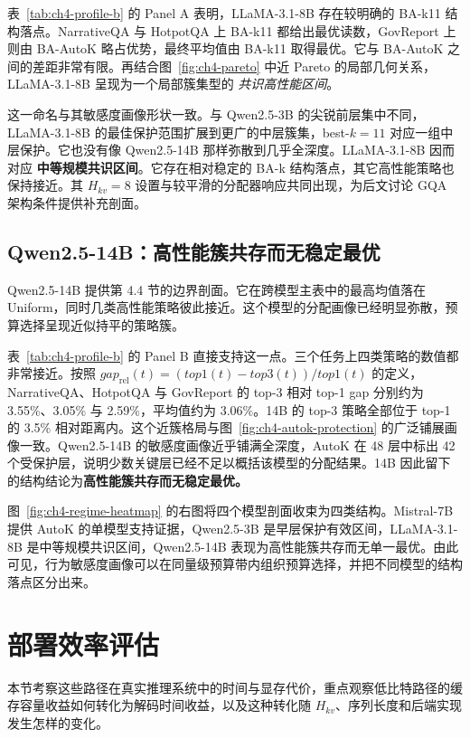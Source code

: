 表~\ref{tab:ch4-profile-b} 的 Panel A 表明，LLaMA-3.1-8B 存在较明确的 BA-k11 结构落点。NarrativeQA 与 HotpotQA 上 BA-k11 都给出最优读数，GovReport 上则由 BA-AutoK 略占优势，最终平均值由 BA-k11 取得最优。它与 BA-AutoK 之间的差距非常有限。再结合图~\ref{fig:ch4-pareto} 中近 Pareto 的局部几何关系，LLaMA-3.1-8B 呈现为一个局部簇集型的 \emph{共识高性能区间}。

这一命名与其敏感度画像形状一致。与 Qwen2.5-3B 的尖锐前层集中不同，LLaMA-3.1-8B 的最佳保护范围扩展到更广的中层簇集，best-$k=11$ 对应一组中层保护。它也没有像 Qwen2.5-14B 那样弥散到几乎全深度。LLaMA-3.1-8B 因而对应 \textbf{中等规模共识区间}。它存在相对稳定的 BA-k 结构落点，其它高性能策略也保持接近。其 $H_{kv}=8$ 设置与较平滑的分配器响应共同出现，为后文讨论 GQA 架构条件提供补充剖面。

\subsection{Qwen2.5-14B：高性能簇共存而无稳定最优}
\label{subsec:ch4-profile-qwen14b}
\label{subsec:exp-per-model-14b}

Qwen2.5-14B 提供第 4.4 节的边界剖面。它在跨模型主表中的最高均值落在 Uniform，同时几类高性能策略彼此接近。这个模型的分配画像已经明显弥散，预算选择呈现近似持平的策略簇。

表~\ref{tab:ch4-profile-b} 的 Panel B 直接支持这一点。三个任务上四类策略的数值都非常接近。按照 $gap_{\mathrm{rel}}(t)=(top1(t)-top3(t))/top1(t)$ 的定义，NarrativeQA、HotpotQA 与 GovReport 的 top-3 相对 top-1 gap 分别约为 3.55\%、3.05\% 与 2.59\%，平均值约为 3.06\%。14B 的 top-3 策略全部位于 top-1 的 3.5\% 相对距离内。这个近簇格局与图~\ref{fig:ch4-autok-protection} 的广泛铺展画像一致。Qwen2.5-14B 的敏感度画像近乎铺满全深度，AutoK 在 48 层中标出 42 个受保护层，说明少数关键层已经不足以概括该模型的分配结果。14B 因此留下的结构结论为\textbf{高性能簇共存而无稳定最优。}

图~\ref{fig:ch4-regime-heatmap} 的右图将四个模型剖面收束为四类结构。Mistral-7B 提供 AutoK 的单模型支持证据，Qwen2.5-3B 是早层保护有效区间，LLaMA-3.1-8B 是中等规模共识区间，Qwen2.5-14B 表现为高性能簇共存而无单一最优。由此可见，行为敏感度画像可以在同量级预算带内组织预算选择，并把不同模型的结构落点区分出来。

\section{部署效率评估}
\label{sec:ch4-deployment}
\label{sec:exp-deployment}

本节考察这些路径在真实推理系统中的时间与显存代价，重点观察低比特路径的缓存容量收益如何转化为解码时间收益，以及这种转化随 $H_{kv}$、序列长度和后端实现发生怎样的变化。

